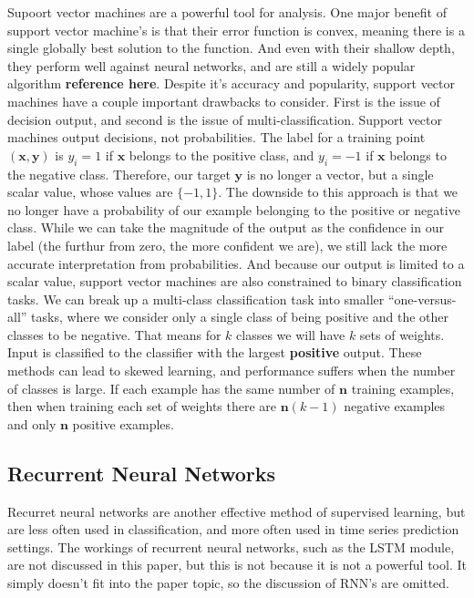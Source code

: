 \message{ !name(main.tex)}\documentclass[11pt]{article}
\newcommand{\mcolor}[2][red]{{\color{#1}\textbf{#2}}}
\begin{document}
Supoort vector machines are a powerful tool for analysis. One major benefit of support vector machine's is that their error function is convex, meaning there is a single globally best solution to the function. And even with their shallow depth, they perform well against neural networks, and are still a widely popular algorithm \textbf{reference here}.
Despite it's accuracy and popularity, support vector machines have a couple important drawbacks to consider. First is the issue of decision output, and second is the issue of multi-classification. Support vector machines output decisions, not probabilities. The label for a training point $(\mathbf{x},\mathbf{y})$ is $y_{i} = 1$ if $\mathbf{x}$ belongs to the positive class, and $y_{i} = -1$ if $\mathbf{x}$ belongs to the negative class. Therefore, our target $\mathbf{y}$ is no longer a vector, but a single scalar value, whose values are $\{-1,1\}$. The downside to this approach is that we no longer have a probability of our example belonging to the positive or negative class. While we can take the magnitude of the output as the confidence in our label (the furthur from zero, the more confident we are), we still lack the more accurate interpretation from probabilities. And because our output is limited to a scalar value, support vector machines are also constrained to binary classification tasks. We can break up a multi-class classification task into smaller ``one-versus-all'' tasks, where we consider only a single class of being positive and the other classes to be negative. That means for $k$ classes we will have $k$ sets of weights. Input is classified to the classifier with the largest \mcolor{positive} output. These methods can lead to skewed learning, and performance suffers when the number of classes is large. If each example has the same number of $\mathbf{n}$ training examples, then when training each set of weights there are $\mathbf{n}(k - 1)$ negative examples and only $\mathbf{n}$ positive examples.


\subsection{Recurrent Neural Networks}
Recurret neural networks are another effective method of supervised learning, but are less often used in classification, and more often used in time series prediction settings. The workings of recurrent neural networks, such as the LSTM module, are not discussed in this paper, but this is not because it is not a powerful tool. It simply doesn't fit into the paper topic, so the discussion of RNN's are omitted.
\end{document}
